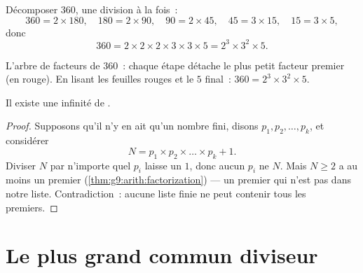 \begin{example}\label{ex:g9:arith:factorization}
Décomposer $360$, une division à la fois~:
\[
360 = 2 \times 180, \quad
180 = 2 \times 90, \quad
90 = 2 \times 45, \quad
45 = 3 \times 15, \quad
15 = 3 \times 5,
\]
donc
\[
360 = 2 \times 2 \times 2 \times 3 \times 3 \times 5 = 2^3 \times 3^2
\times 5 .
\]
\end{example}

\begin{omfigure}

{\small L'arbre de facteurs de $360$~: chaque étape détache le plus
petit facteur premier (en rouge). En lisant les feuilles rouges et le
$5$ final~: $360 = 2^3 \times 3^2 \times 5$.}
\end{omfigure}

\begin{theorem}[Euclide]\label{thm:g9:arith:euclid}
Il existe une infinité de .
\end{theorem}

\begin{proof}
Supposons qu'il n'y en ait qu'un nombre fini, disons $p_1, p_2, \dots,
p_k$, et considérer
\[
N = p_1 \times p_2 \times \dots \times p_k + 1 .
\]
Diviser $N$ par n'importe quel $p_i$ laisse un  $1$, donc aucun
$p_i$ ne  $N$. Mais $N \geq 2$ a au moins un  premier
(\cref{thm:g9:arith:factorization}) --- un premier qui n'est pas dans
notre liste. Contradiction~: aucune liste finie ne peut contenir tous
les premiers.
\end{proof}

\section{Le plus grand commun diviseur}

